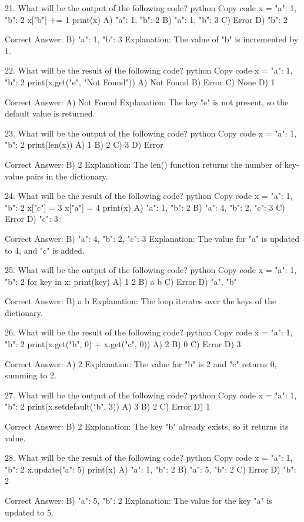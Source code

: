 21. What will be the output of the following code?
python
Copy code
x = {"a": 1, "b": 2}
x["b"] += 1
print(x)
A) {"a": 1, "b": 2}
B) {"a": 1, "b": 3}
C) Error
D) {"b": 2}

Correct Answer: B) {"a": 1, "b": 3}
Explanation: The value of "b" is incremented by 1.

22. What will be the result of the following code?
python
Copy code
x = {"a": 1, "b": 2}
print(x.get("e", "Not Found"))
A) Not Found
B) Error
C) None
D) 1

Correct Answer: A) Not Found
Explanation: The key "e" is not present, so the default value is returned.

23. What will be the output of the following code?
python
Copy code
x = {"a": 1, "b": 2}
print(len(x))
A) 1
B) 2
C) 3
D) Error

Correct Answer: B) 2
Explanation: The len() function returns the number of key-value pairs in the dictionary.

24. What will be the result of the following code?
python
Copy code
x = {"a": 1, "b": 2}
x["c"] = 3
x["a"] = 4
print(x)
A) {"a": 1, "b": 2}
B) {"a": 4, "b": 2, "c": 3}
C) Error
D) {"c": 3}

Correct Answer: B) {"a": 4, "b": 2, "c": 3}
Explanation: The value for "a" is updated to 4, and "c" is added.

25. What will be the output of the following code?
python
Copy code
x = {"a": 1, "b": 2}
for key in x:
    print(key)
A) 1 2
B) a b
C) Error
D) {"a", "b"}

Correct Answer: B) a b
Explanation: The loop iterates over the keys of the dictionary.

26. What will be the result of the following code?
python
Copy code
x = {"a": 1, "b": 2}
print(x.get("b", 0) + x.get("c", 0))
A) 2
B) 0
C) Error
D) 3

Correct Answer: A) 2
Explanation: The value for "b" is 2 and "c" returns 0, summing to 2.

27. What will be the output of the following code?
python
Copy code
x = {"a": 1, "b": 2}
print(x.setdefault("b", 3))
A) 3
B) 2
C) Error
D) 1

Correct Answer: B) 2
Explanation: The key "b" already exists, so it returns its value.

28. What will be the result of the following code?
python
Copy code
x = {"a": 1, "b": 2}
x.update({"a": 5})
print(x)
A) {"a": 1, "b": 2}
B) {"a": 5, "b": 2}
C) Error
D) {"b": 2}

Correct Answer: B) {"a": 5, "b": 2}
Explanation: The value for the key "a" is updated to 5.

